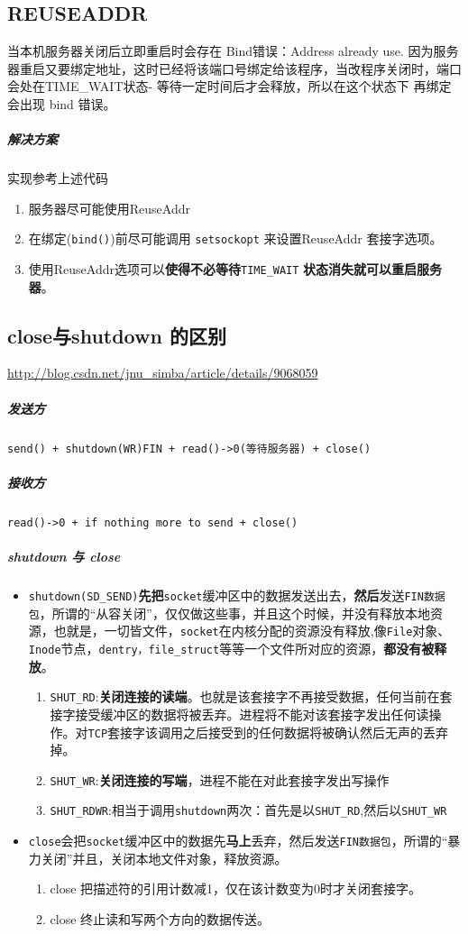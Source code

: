 \documentclass[UTF8,a4paper,12pt]{ctexbook}
\begin{document}
		\subsection{REUSEADDR}
			当本机服务器关闭后立即重启时会存在 Bind错误：Address already use. 因为服务器重启又要绑定地址，这时已经将该端口号绑定给该程序，当改程序关闭时，端口会处在TIME\_WAIT状态- 等待一定时间后才会释放，所以在这个状态下 再绑定 会出现 bind 错误。
			
			\subparagraph{解决方案}实现参考上述代码
			
				\begin{enumerate}
					\item 服务器尽可能使用ReuseAddr
					\item 在绑定(\verb|bind()|)前尽可能调用 \verb|setsockopt| 来设置ReuseAddr 套接字选项。 
					\item 使用ReuseAddr选项可以\textbf{使得不必等待}\verb|TIME_WAIT| \textbf{状态消失就可以重启服务器}。
				\end{enumerate}
				
		\subsection{close与shutdown 的区别}
			\url{http://blog.csdn.net/jnu_simba/article/details/9068059}
			\subparagraph{发送方}
				\verb|send() + shutdown(WR)FIN + read()->0(等待服务器) + close()|
			\subparagraph{接收方}
				\verb|read()->0 + if nothing more to send + close()|
				
			\subparagraph{shutdown 与 close}
				\begin{itemize}[itemindent = 1em]
					\item \verb|shutdown(SD_SEND)|\textbf{先把}\verb|socket|缓冲区中的数据发送出去，\textbf{然后}发送\verb|FIN数据包|，所谓的“从容关闭”，仅仅做这些事，并且这个时候，并没有释放本地资源，也就是，一切皆文件，\verb|socket|在内核分配的资源没有释放,像\verb|File|对象、\verb|Inode|节点，\verb|dentry，file_struct|等等一个文件所对应的资源，\textbf{都没有被释放}。
						\begin{enumerate}[itemindent = 1em]
							\item \verb|SHUT_RD|:\textbf{关闭连接的读端}。也就是该套接字不再接受数据，任何当前在套接字接受缓冲区的数据将被丢弃。进程将不能对该套接字发出任何读操作。对\verb|TCP|套接字该调用之后接受到的任何数据将被确认然后无声的丢弃掉。
							\item \verb|SHUT_WR|:\textbf{关闭连接的写端}，进程不能在对此套接字发出写操作 
							\item \verb|SHUT_RDWR|:相当于调用\verb|shutdown|两次：首先是以\verb|SHUT_RD|,然后以\verb|SHUT_WR| 
						\end{enumerate}
					\item \verb|close|会把\verb|socket|缓冲区中的数据先\textbf{马上}丢弃，然后发送\verb|FIN数据包|，所谓的“暴力关闭”并且，关闭本地文件对象，释放资源。
						\begin{enumerate}[itemindent = 1em]
							\item close 把描述符的引用计数减1，仅在该计数变为0时才关闭套接字。
							\item close 终止读和写两个方向的数据传送。
						\end{enumerate}
				\end{itemize}
		
\end{document}
